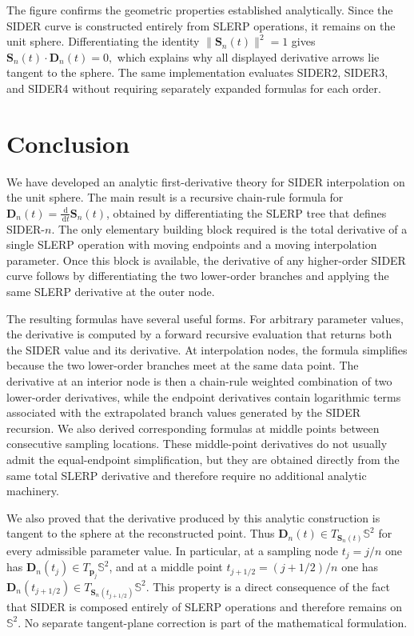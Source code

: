 \documentclass[a4paper,11pt]{article}
\newcommand{\bp}{\mathbf{p}}
\newcommand{\bD}{\mathbf{D}}
\numberwithin{equation}{section}
\theoremstyle{plain}
\theoremstyle{definition}
\theoremstyle{remark}
\newcommand{\Sph}{\mathbb{S}^2}
\newcommand{\dd}{\,\mathrm{d}}
\begin{document}
The figure confirms the geometric properties established analytically.  Since the SIDER curve is constructed entirely from SLERP operations, it remains on the unit sphere.  Differentiating the identity
\(\|\mathbf{S}_n(t)\|^2=1\)
gives
\(\mathbf{S}_n(t)\cdot \mathbf{D}_n(t)=0,\)
which explains why all displayed derivative arrows lie tangent to the sphere.  The same implementation evaluates SIDER2, SIDER3, and SIDER4 without requiring separately expanded formulas for each order.

\section{Conclusion}

We have developed an analytic first-derivative theory for SIDER interpolation on the unit sphere.  The main result is a recursive chain-rule formula for \(\bD_n(t)=\frac{\dd}{\dd t}\mathbf{S}_n(t)\), obtained by differentiating the SLERP tree that defines SIDER-\(n\).  The only elementary building block required is the total derivative of a single SLERP operation with moving endpoints and a moving interpolation parameter.  Once this block is available, the derivative of any higher-order SIDER curve follows by differentiating the two lower-order branches and applying the same SLERP derivative at the outer node.

The resulting formulas have several useful forms.  For arbitrary parameter values, the derivative is computed by a forward recursive evaluation that returns both the SIDER value and its derivative.  At interpolation nodes, the formula simplifies because the two lower-order branches meet at the same data point.  The derivative at an interior node is then a chain-rule weighted combination of two lower-order derivatives, while the endpoint derivatives contain logarithmic terms associated with the extrapolated branch values generated by the SIDER recursion.  We also derived corresponding formulas at middle points between consecutive sampling locations.  These middle-point derivatives do not usually admit the equal-endpoint simplification, but they are obtained directly from the same total SLERP derivative and therefore require no additional analytic machinery.

We also proved that the derivative produced by this analytic construction is tangent to the sphere at the reconstructed point.  Thus \(\bD_n(t)\in T_{\mathbf{S}_n(t)}\Sph\) for every admissible parameter value.  In particular, at a sampling node \(t_j=j/n\) one has \(\bD_n(t_j)\in T_{\bp_j}\Sph\), and at a middle point \(t_{j+1/2}=(j+1/2)/n\) one has \(\bD_n(t_{j+1/2})\in T_{\mathbf{S}_n(t_{j+1/2})}\Sph\).  This property is a direct consequence of the fact that SIDER is composed entirely of SLERP operations and therefore remains on \(\Sph\).  No separate tangent-plane correction is part of the mathematical formulation.
\end{document}
